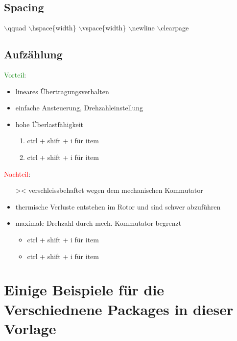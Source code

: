 \subsection{Spacing}
    $\backslash$qquad \newline
    $\backslash$hspace\{width\}\newline
    $\backslash$vspace\{width\}\newline
    $\backslash$newline\newline
    $\backslash$clearpage\newline
    \clearpage
\subsection{Aufzählung}
\textcolor{green}{Vorteil}:
\begin{itemize} 
    \item lineares Übertragungsverhalten
    \item einfache Ansteuerung, Drehzahleinstellung
    \item hohe Überlastfähigkeit
    \begin{enumerate}
        \item ctrl + shift + i für item
        \item ctrl + shift + i für item
    \end{enumerate}
\end{itemize}
\textcolor{red}{Nachteil}:
\begin{itemize}
    \item[><] verschleissbehaftet wegen dem mechanischen Kommutator
    \item thermische Verluste entstehen im Rotor und sind schwer abzuführen
    \item maximale Drehzahl durch mech. Kommutator begrenzt
    \begin{itemize}
        \item ctrl + shift + i für item
        \item ctrl + shift + i für item
    \end{itemize}
\end{itemize}

\section*{Einige Beispiele für die Verschiednene Packages in dieser Vorlage}
